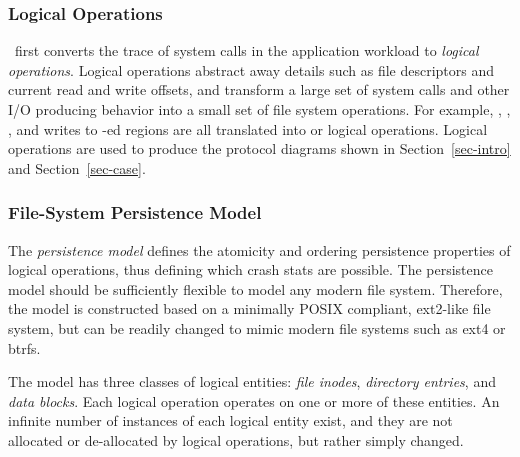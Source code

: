 \subsubsection{Logical Operations}

\toolname\ first converts the trace of system calls in the application
workload to \textit{logical operations}. Logical operations abstract away
details such as file descriptors and current read and write offsets, and
transform a large set of system calls and other I/O producing behavior into a
small set of file system operations. For example, ,
, ,  and writes to
-ed regions are all translated into  or
 logical operations. Logical operations are used to
produce the protocol diagrams shown in Section~\ref{sec-intro} and
Section~\ref{sec-case}.

\subsubsection{File-System Persistence Model}

 



The {\em persistence model} defines the atomicity and ordering persistence
properties of logical operations, thus defining which crash stats are
possible. The persistence model should be sufficiently flexible to model any
modern file system. Therefore, the model is constructed based on a minimally
POSIX compliant, ext2-like file system, but can be readily changed to mimic
modern file systems such as ext4 or btrfs. 


The model has three classes of logical entities: {\em file inodes}, {\em
directory entries}, and {\em data blocks}. Each logical operation operates on
one or more of these entities. An infinite number of instances of each logical
entity exist, and they are not allocated or de-allocated by logical operations,
but rather simply changed.

